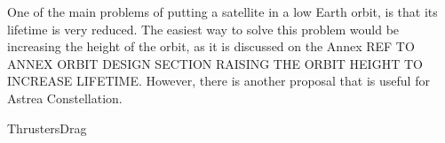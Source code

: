 
One of the main problems of putting a satellite in a low Earth orbit, is that its lifetime is very reduced. The easiest way to solve this problem would be increasing the height of the orbit, as it is discussed on the Annex REF TO ANNEX ORBIT DESIGN SECTION RAISING THE ORBIT HEIGHT TO INCREASE LIFETIME. However, there is another proposal that is useful for Astrea Constellation.

{ThrustersDrag}
